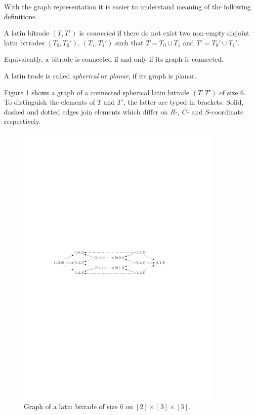 With the graph representation it is easier to understand meaning of the following definitions.

\begin{defn}
A latin bitrade $(T,T')$ is \emph{connected} if there do not exist two non-empty disjoint latin bitrades $(T_0,T_0')$, $(T_1,T_1')$ such that $T = T_0 \cup T_1$ and $T' = T_0' \cup T_1'$.

Equivalently, a bitrade is connected if and only if its graph is connected.
\end{defn}

\begin{defn}
A latin trade is called \emph{spherical} or \emph{planar}, if its graph is planar.
\end{defn}

\begin{exmp}
\label{exmp:graph-bitrade}
Figure \ref{fig:graph-bitrade} shows a graph of a connected spherical latin bitrade $(T,T')$ of size 6. To distinguish the elements of $T$ and $T'$, the latter are typed in brackets. Solid, dashed and dotted edges join elements which differ on $R$-, $C$- and $S$-coordinate respectively.

\begin{figure}[htb]
\centering
\includegraphics[width=0.9\textwidth]{img/graph_example.pdf}
\caption{Graph of a latin bitrade of size 6 on $[2] \times [3] \times [3]$.}
\label{fig:graph-bitrade}
\end{figure}
\end{exmp}%

